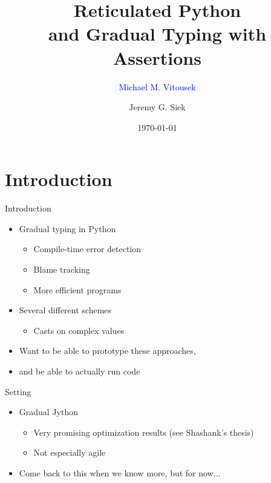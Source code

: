 \documentclass[mathserif]{beamer}
\title[Gradual Python]{Reticulated Python\\
and Gradual Typing with Assertions}
\author[Vitousek, Siek]
       {\textcolor{blue}{Michael M. Vitousek}\and Jeremy G. Siek}
\date{\today}
\newcommand{\pif}{}
\begin{document}
%
\begin{frame}
\titlepage
\end{frame}
%

\section{Introduction}
\begin{frame}{Introduction}
  \begin{itemize}
  \item Gradual typing in Python
    \begin{itemize}
    \item Compile-time error detection 
    \item Blame tracking 
    \item More efficient programs\pif
    \end{itemize}
  \item Several different schemes
    \begin{itemize}
    \item Casts on complex values
    \end{itemize}
  \item Want to be able to prototype these approaches,
  \item and be able to actually run code
  \end{itemize}
\end{frame}

\begin{frame}{Setting}
  \begin{itemize}
  \item Gradual Jython
    \begin{itemize}
    \item Very promising optimization results (see Shashank's thesis)
    \item Not especially agile
    \end{itemize}
  \item Come back to this when we know more, but for now...
  \end{itemize}
\end{frame}
\end{document}
